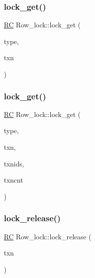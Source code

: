 \mbox{\label{classRow__lock_a73d7d8b8dba43b90e69e52f8596dd4c7}} 
\subsubsection{\texorpdfstring{lock\+\_\+get()}{lock\_get()}\hspace{0.1cm}{\footnotesize\ttfamily [1/2]}}
{\footnotesize\ttfamily \hyperlink{global_8h_a78c49a674c810fdd03d20432f7be864a}{RC} Row\+\_\+lock\+::lock\+\_\+get (\begin{DoxyParamCaption}\item[{\hyperlink{global_8h_a1da8554b34c21f74268d962b6559b0a6}{lock\+\_\+t}}]{type,  }\item[{\hyperlink{classtxn__man}{txn\+\_\+man} $\ast$}]{txn }\end{DoxyParamCaption})}

\mbox{\label{classRow__lock_a09a8f64b3aa2560f46f185f603fb3571}} 
\subsubsection{\texorpdfstring{lock\+\_\+get()}{lock\_get()}\hspace{0.1cm}{\footnotesize\ttfamily [2/2]}}
{\footnotesize\ttfamily \hyperlink{global_8h_a78c49a674c810fdd03d20432f7be864a}{RC} Row\+\_\+lock\+::lock\+\_\+get (\begin{DoxyParamCaption}\item[{\hyperlink{global_8h_a1da8554b34c21f74268d962b6559b0a6}{lock\+\_\+t}}]{type,  }\item[{\hyperlink{classtxn__man}{txn\+\_\+man} $\ast$}]{txn,  }\item[{uint64\+\_\+t $\ast$\&}]{txnids,  }\item[{int \&}]{txncnt }\end{DoxyParamCaption})}

\mbox{\label{classRow__lock_adb95df1dc909b5f6400506ae00255834}} 
\subsubsection{\texorpdfstring{lock\+\_\+release()}{lock\_release()}}
{\footnotesize\ttfamily \hyperlink{global_8h_a78c49a674c810fdd03d20432f7be864a}{RC} Row\+\_\+lock\+::lock\+\_\+release (\begin{DoxyParamCaption}\item[{\hyperlink{classtxn__man}{txn\+\_\+man} $\ast$}]{txn }\end{DoxyParamCaption})}

